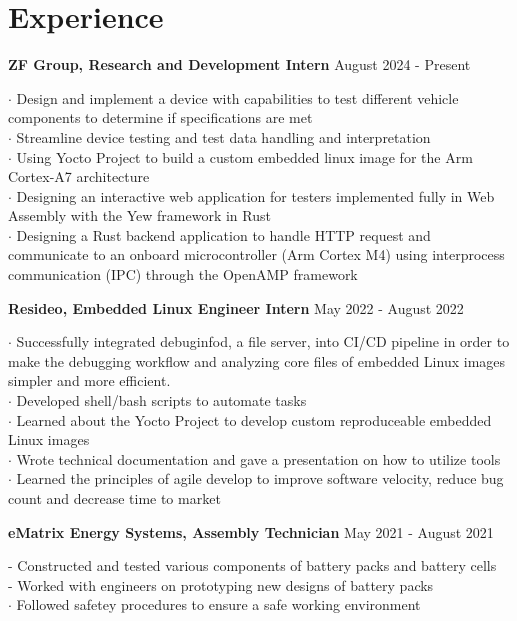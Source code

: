 \documentclass[letter,12pt]{article}
\begin{document}
\vspace{-.5cm}
\section*{Experience} 
\begin{tcolorbox}
[colback=gray!25,
  leftrule=0pt,
  rightrule=0pt,
  sharp corners]
\textbf{ZF Group, Research and Development Intern} \hfill August 2024 - Present 
\end{tcolorbox}
\noindent$\cdot$ Design and implement a device with capabilities to test different vehicle components to determine if specifications are met\\
$\cdot$ Streamline device testing and test data handling and interpretation\\
$\cdot$ Using Yocto Project to build a custom embedded linux image for the Arm Cortex-A7 architecture \\
$\cdot$ Designing an interactive web application for testers implemented fully in Web Assembly with the Yew framework in Rust \\
$\cdot$ Designing a Rust backend application to handle HTTP request and communicate to an onboard microcontroller (Arm Cortex M4)
using interprocess communication (IPC) through the OpenAMP framework\\
\vspace{-.5cm}
\begin{tcolorbox}
[colback=gray!25,
  leftrule=0pt,
  rightrule=0pt,
  sharp corners]
\noindent\textbf{Resideo, Embedded Linux
Engineer Intern} \hfill May 2022 - August 2022 
\end{tcolorbox}
\noindent$\cdot$ Successfully integrated
debuginfod, a file server, into CI/CD pipeline in order to make the debugging
workflow and analyzing core files of embedded Linux images simpler and more
efficient.\\
$\cdot$ Developed shell/bash scripts to automate tasks\\
$\cdot$ Learned about the Yocto Project to develop custom reproduceable 
embedded Linux images\\
$\cdot$ Wrote technical documentation and gave a presentation on 
how to utilize tools\\
$\cdot$ Learned the principles of agile develop to improve software 
velocity, reduce bug count and decrease time to market\\
\vspace{-.5cm}
\begin{tcolorbox}
[colback=gray!25,
  leftrule=0pt,
  rightrule=0pt,
  sharp corners]
 \textbf{eMatrix Energy Systems, Assembly Technician}
\hfill May 2021 - August 2021 
\end{tcolorbox}
\noindent 
- Constructed and tested various components of
battery packs and battery cells\\ 
- Worked with engineers on prototyping new designs of battery packs\\
$\cdot$ Followed safetey procedures to ensure a safe working environment
\vspace{-.5cm} 
\end{document}
